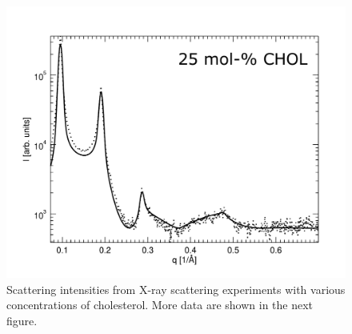 \documentclass[journal=jpcbfk]{achemso}
\begin{document}
\begin{figure}[htb!]
    \includegraphics[width=0.45\linewidth]{../FIGS/scatt25.pdf}
    \caption{Scattering intensities from X-ray scattering experiments with various concentrations of cholesterol. More data are shown in the next figure.}
    \label{SIfig:scattering1}
\end{figure}

\clearpage
\end{document}
